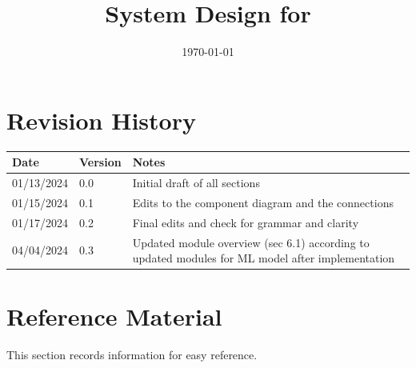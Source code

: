 \documentclass[12pt, titlepage]{article}
\begin{document}
\title{System Design for \progname{}} 
\author{\authname}
\date{\today}

\maketitle


\section{Revision History}

\begin{tabularx}{\textwidth}{p{3cm}p{2cm}X}
\toprule {\bf Date} & {\bf Version} & {\bf Notes}\\
\midrule
01/13/2024 & 0.0 & Initial draft of all sections\\
01/15/2024 & 0.1 & Edits to the component diagram and the connections\\
01/17/2024 & 0.2 & Final edits and check for grammar and clarity \\
04/04/2024 & 0.3 & Updated module overview (sec 6.1) according to updated modules for ML model after implementation \\
\bottomrule
\end{tabularx}

\newpage

\section{Reference Material}

This section records information for easy reference.
\end{document}
